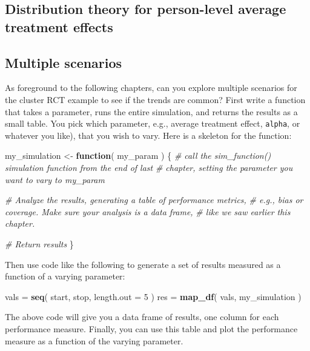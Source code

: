 \documentclass[
]{book}
\newenvironment{Shaded}{\begin{snugshade}}{\end{snugshade}}
\newcommand{\AttributeTok}[1]{\textcolor[rgb]{0.13,0.29,0.53}{#1}}
\newcommand{\CommentTok}[1]{\textcolor[rgb]{0.56,0.35,0.01}{\textit{#1}}}
\newcommand{\ControlFlowTok}[1]{\textcolor[rgb]{0.13,0.29,0.53}{\textbf{#1}}}
\newcommand{\DecValTok}[1]{\textcolor[rgb]{0.00,0.00,0.81}{#1}}
\newcommand{\FunctionTok}[1]{\textcolor[rgb]{0.13,0.29,0.53}{\textbf{#1}}}
\newcommand{\NormalTok}[1]{#1}
\newcommand{\OtherTok}[1]{\textcolor[rgb]{0.56,0.35,0.01}{#1}}
\begin{document}
\subsection{Distribution theory for person-level average treatment effects}\label{cluster-RCT-SPATE}

\subsection{Multiple scenarios}\label{multiple-scenario-performance}

As foreground to the following chapters, can you explore multiple scenarios for the cluster RCT example to see if the trends are common? First write a function that takes a parameter, runs the entire simulation, and returns the results as a small table. You pick which parameter, e.g., average treatment effect, \texttt{alpha}, or whatever you like), that you wish to vary. Here is a skeleton for the function:

\begin{Shaded}
\begin{Highlighting}[]
\NormalTok{my\_simulation }\OtherTok{\textless{}{-}} \ControlFlowTok{function}\NormalTok{( my\_param ) \{}
  \CommentTok{\# call the sim\_function() simulation function from the end of last}
  \CommentTok{\# chapter, setting the parameter you want to vary to my\_param}
  
  \CommentTok{\# Analyze the results, generating a table of performance metrics,}
  \CommentTok{\# e.g., bias or coverage. Make sure your analysis is a data frame,}
  \CommentTok{\# like we saw earlier this chapter.}
  
  \CommentTok{\# Return results}
\NormalTok{\}}
\end{Highlighting}
\end{Shaded}

Then use code like the following to generate a set of results measured as a function of a varying parameter:

\begin{Shaded}
\begin{Highlighting}[]
\NormalTok{vals }\OtherTok{=} \FunctionTok{seq}\NormalTok{( start, stop, }\AttributeTok{length.out =} \DecValTok{5}\NormalTok{ )}
\NormalTok{res }\OtherTok{=} \FunctionTok{map\_df}\NormalTok{( vals, my\_simulation ) }
\end{Highlighting}
\end{Shaded}

The above code will give you a data frame of results, one column for each performance measure.
Finally, you can use this table and plot the performance measure as a function of the varying parameter.
\end{document}
